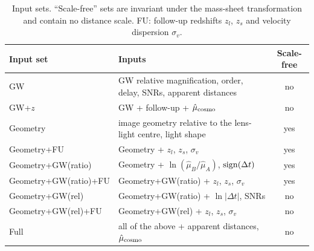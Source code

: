 \begin{table}
\centering\papertablestyle
\caption{Input sets. ``Scale-free'' sets are invariant under the mass-sheet transformation and contain no distance scale. FU: follow-up redshifts $z_l$, $z_s$ and velocity dispersion $\sigma_v$.}
\label{tab:inputsets}
\begin{tabularx}{\columnwidth}{@{}lLc@{}}
\toprule
Input set & Inputs & Scale-free \\
\midrule
GW & GW relative magnification, order, delay, SNRs, apparent distances & no \\
GW+$z$ & GW + follow-up + $\hat\mu_{\rm cosmo}$ & no \\
Geometry & image geometry relative to the lens-light centre, light shape & yes \\
Geometry+FU & Geometry + $z_l$, $z_s$, $\sigma_v$ & yes \\
Geometry+GW(ratio) & Geometry + $\ln(\hat\mu_B/\hat\mu_A)$, ${\rm sign}(\Delta t)$ & yes \\
Geometry+GW(ratio)+FU & Geometry+GW(ratio) + $z_l$, $z_s$, $\sigma_v$ & yes \\
Geometry+GW(rel) & Geometry+GW(ratio) + $\ln|\Delta t|$, SNRs & no \\
Geometry+GW(rel)+FU & Geometry+GW(rel) + $z_l$, $z_s$, $\sigma_v$ & no \\
Full & all of the above + apparent distances, $\hat\mu_{\rm cosmo}$ & no \\
\bottomrule
\end{tabularx}
\end{table}

